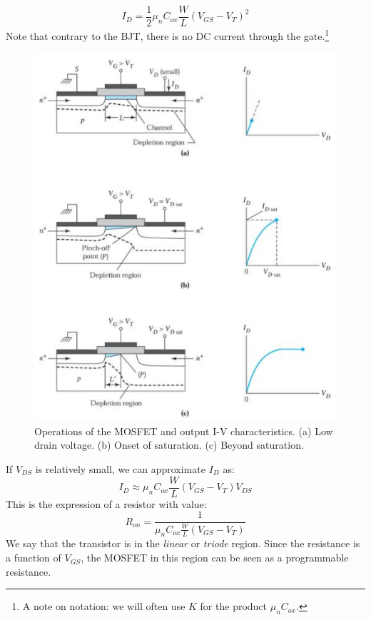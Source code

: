 \begin{equation}
    I_{D} = \frac{1}{2} \mu_n C_{ox} \frac{W}{L} (V_{GS} - V_T)^2
    \label{eq:sat_current}
\end{equation}
Note that contrary to the BJT, there is no DC current through the gate.\footnote{A note on notation: we will often use $K$ for the product $\mu_n C_{ox}$.}

\begin{figure}[h!]
\centering
\includegraphics[width=12cm]{figures/ch01/mosfet2.jpg}
\caption{Operations of the MOSFET and output I-V characteristics. (a) Low drain voltage. (b) Onset of saturation. (c) Beyond saturation.} 
\label{fig:mosfet2}
\end{figure}

If $V_{DS}$ is relatively small, we can approximate $I_D$ as:
$$I_D \approx  \mu_n C_{ox} \frac{W}{L} (V_{GS} - V_T) V_{DS}$$
This is the expression of a resistor with value:
$$R_{on} = \frac{1}{\mu_n C_{ox} \frac{W}{L} (V_{GS} - V_T)}$$
We say that the transistor is in the \emph{linear} or \emph{triode} region. Since the resistance is a function of $V_{GS}$, the MOSFET in this region can be seen as a programmable resistance.

